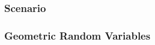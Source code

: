 \documentclass[slides]{beamer}
\newcommand{\blue}[1]{\textcolor{blue2}{#1}}
\begin{document}
\begin{frame}[fragile]
\frametitle{Scenario}

%
%
%
%
%

\end{frame}


\begin{frame}[fragile]
\frametitle{Geometric Random Variables}

%
%
%


\end{frame}
\end{document}
